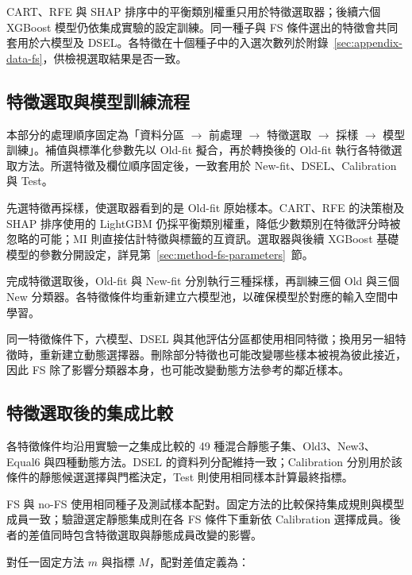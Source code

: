 \endgroup

CART、RFE 與 SHAP 排序中的平衡類別權重只用於特徵選取器；後續六個 XGBoost 模型仍依集成實驗的設定訓練。同一種子與 FS 條件選出的特徵會共同套用於六模型及 DSEL。各特徵在十個種子中的入選次數列於附錄~\ref{sec:appendix-data-fs}，供檢視選取結果是否一致。


\subsection{特徵選取與模型訓練流程}

本部分的處理順序固定為「資料分區 \ensuremath{\rightarrow} 前處理 \ensuremath{\rightarrow} 特徵選取 \ensuremath{\rightarrow} 採樣 \ensuremath{\rightarrow} 模型訓練」。補值與標準化參數先以 Old-fit 擬合，再於轉換後的 Old-fit 執行各特徵選取方法。所選特徵及欄位順序固定後，一致套用於 New-fit、DSEL、Calibration 與 Test。

先選特徵再採樣，使選取器看到的是 Old-fit 原始樣本。CART、RFE 的決策樹及 SHAP 排序使用的 LightGBM 仍採平衡類別權重，降低少數類別在特徵評分時被忽略的可能；MI 則直接估計特徵與標籤的互資訊。選取器與後續 XGBoost 基礎模型的參數分開設定，詳見第~\ref{sec:method-fs-parameters}~節。

完成特徵選取後，Old-fit 與 New-fit 分別執行三種採樣，再訓練三個 Old 與三個 New 分類器。各特徵條件均重新建立六模型池，以確保模型於對應的輸入空間中學習。

同一特徵條件下，六模型、DSEL 與其他評估分區都使用相同特徵；換用另一組特徵時，重新建立動態選擇器。刪除部分特徵也可能改變哪些樣本被視為彼此接近，因此 FS 除了影響分類器本身，也可能改變動態方法參考的鄰近樣本。

\subsection{特徵選取後的集成比較}

各特徵條件均沿用實驗一之集成比較的 49 種混合靜態子集、Old3、New3、Equal6 與四種動態方法。DSEL 的資料列分配維持一致；Calibration 分別用於該條件的靜態候選選擇與門檻決定，Test 則使用相同樣本計算最終指標。

FS 與 no-FS 使用相同種子及測試樣本配對。固定方法的比較保持集成規則與模型成員一致；驗證選定靜態集成則在各 FS 條件下重新依 Calibration 選擇成員。後者的差值同時包含特徵選取與靜態成員改變的影響。

對任一固定方法 \(m\) 與指標 \(M\)，配對差值定義為：


